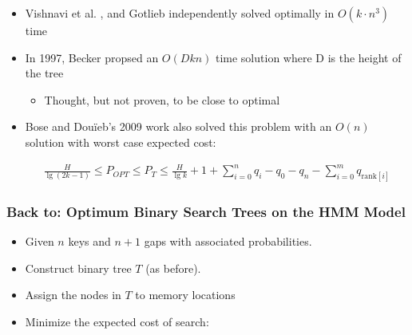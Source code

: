 \documentclass{beamer}
\theoremstyle{plain}
\begin{document}
\begin{frame}

\begin{itemize}

\item Vishnavi et al. \cite{vaishnavi1980optimum}, and Gotlieb  \cite{gotlieb1981optimal} independently solved optimally in $O(k\cdot n^3)$ time

\item In 1997, Becker propsed an $O(Dkn)$ time solution where D is the height of the tree \cite{becker1997construction}
\begin{itemize}
\item Thought, but not proven, to be close to optimal
\end{itemize}

\item Bose and Dou\"{i}eb's 2009 work also solved this problem with an $O(n)$ solution with worst case expected cost:
\begin{scriptsize}
\begin{align*}
\frac{H}{\lg(2k-1)} \leq P_{OPT} \leq P_T \leq \frac{H}{\lg k} + 1 + \sum_{i=0}^n q_i - q_0 - q_n - \sum_{i=0}^m q_{\text{rank}[i]}
\end{align*}
\end{scriptsize}

\end{itemize}


\end{frame}

\begin{frame} \frametitle{Back to: Optimum Binary Search Trees on the HMM Model}
\begin{itemize}
\item Given $n$ keys and $n+1$ gaps with associated probabilities.  
\item Construct binary tree $T$ (as before).
\item Assign the nodes in $T$ to memory locations
\item Minimize the expected cost of search:
\end{itemize}
\end{frame}
\end{document}
